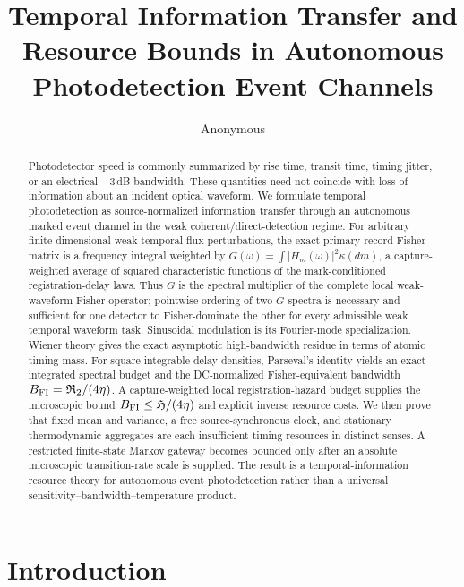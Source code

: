 \documentclass[aps,prapplied,preprint,nofootinbib]{revtex4-2}
\begin{document}
\title{Temporal Information Transfer and Resource Bounds in Autonomous Photodetection Event Channels}
\author{Anonymous}

\begin{abstract}
Photodetector speed is commonly summarized by rise time, transit time, timing jitter, or an electrical $-3\,$dB bandwidth. These quantities need not coincide with loss of information about an incident optical waveform. We formulate temporal photodetection as source-normalized information transfer through an autonomous marked event channel in the weak coherent/direct-detection regime. For arbitrary finite-dimensional weak temporal flux perturbations, the exact primary-record Fisher matrix is a frequency integral weighted by
$G(\omega)=\int |H_m(\omega)|^2\kappa(dm)$, a capture-weighted average of squared characteristic functions of the mark-conditioned registration-delay laws. Thus $G$ is the spectral multiplier of the complete local weak-waveform Fisher operator; pointwise ordering of two $G$ spectra is necessary and sufficient for one detector to Fisher-dominate the other for every admissible weak temporal waveform task. Sinusoidal modulation is its Fourier-mode specialization. Wiener theory gives the exact asymptotic high-bandwidth residue in terms of atomic timing mass. For square-integrable delay densities, Parseval's identity yields an exact integrated spectral budget and the DC-normalized Fisher-equivalent bandwidth $B_{\rm FI}=\mathfrak R_2/(4\eta)$. A capture-weighted local registration-hazard budget supplies the microscopic bound $B_{\rm FI}\le\mathfrak H/(4\eta)$ and explicit inverse resource costs. We then prove that fixed mean and variance, a free source-synchronous clock, and stationary thermodynamic aggregates are each insufficient timing resources in distinct senses. A restricted finite-state Markov gateway becomes bounded only after an absolute microscopic transition-rate scale is supplied. The result is a temporal-information resource theory for autonomous event photodetection rather than a universal sensitivity--bandwidth--temperature product.
\end{abstract}

\maketitle

\section{Introduction}
\end{document}

